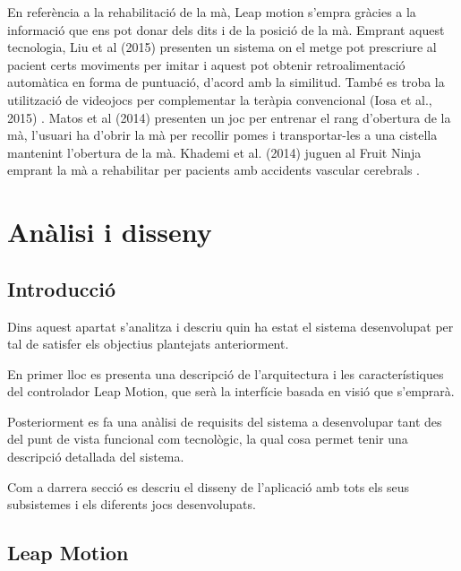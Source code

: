 \documentclass[12pt,a4paper,catalan]{article}
\begin{document}
	En referència a la rehabilitació de la mà, Leap motion s'empra gràcies a la informació que ens pot donar dels dits i de la posició de la mà. Emprant aquest tecnologia, Liu et al (2015) \cite{liu-rehab} presenten un sistema on el metge pot prescriure al pacient certs moviments per imitar i aquest pot obtenir retroalimentació automàtica en forma de puntuació, d'acord amb la similitud. També es troba la utilització de videojocs per complementar la teràpia convencional (Iosa et al., 2015) \cite{losa-rehab}. Matos et al (2014) \cite{kinteract} presenten un joc per entrenar el rang d'obertura de la mà, l'usuari ha d'obrir la mà per recollir pomes i transportar-les a una cistella mantenint l'obertura de la mà. Khademi et al. (2014) juguen al Fruit Ninja emprant  la mà a rehabilitar per pacients amb accidents vascular cerebrals \cite{leap-fruit-ninja}.
	\section{Anàlisi i disseny}
	\subsection{Introducció}
	Dins aquest apartat s'analitza i descriu quin ha estat el sistema desenvolupat per tal de satisfer els objectius plantejats anteriorment.
	
	En primer lloc es presenta una descripció de l'arquitectura i les característiques del controlador Leap Motion, que serà la interfície basada en visió que s'emprarà.
	
	Posteriorment es fa una anàlisi de requisits del sistema a desenvolupar tant des del punt de vista funcional com tecnològic, la qual cosa permet tenir una descripció detallada del sistema.
	
	Com a darrera secció es descriu el disseny de l'aplicació amb tots els seus subsistemes i els diferents jocs desenvolupats.
	\subsection{Leap Motion}
\end{document}
